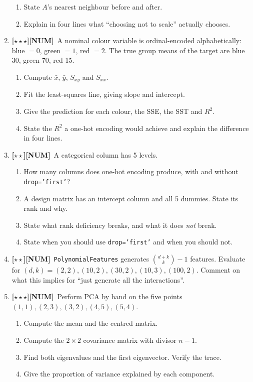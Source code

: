 \documentclass[11pt,a4paper]{article}
\newcommand{\LA}{{\footnotesize\textbf{[$\star\star\star$]}}}
\newcommand{\LB}{{\footnotesize\textbf{[$\star\star$]}}}
\newcommand{\NUM}{{\footnotesize\textbf{[NUM]}}}
\newcommand{\Q}[1]{\item[\textbf{#1}]}
\begin{document}
\begin{enumerate}[leftmargin=2.2cm]
\begin{enumerate}[label=(\alph*)]
    \item State $A$'s nearest neighbour before and after.
    \item Explain in four lines what ``choosing not to scale'' actually chooses.
  \end{enumerate}
\Q{U4.65}\LA\NUM\ A nominal colour variable is ordinal-encoded alphabetically:
  blue $=0$, green $=1$, red $=2$. The true group means of the target are
  blue 30, green 70, red 15.
  \begin{enumerate}[label=(\alph*)]
    \item Compute $\bar x$, $\bar y$, $S_{xy}$ and $S_{xx}$.
    \item Fit the least-squares line, giving slope and intercept.
    \item Give the prediction for each colour, the SSE, the SST and $R^2$.
    \item State the $R^2$ a one-hot encoding would achieve and explain the
      difference in four lines.
  \end{enumerate}
\Q{U4.66}\LB\NUM\ A categorical column has 5 levels.
  \begin{enumerate}[label=(\alph*)]
    \item How many columns does one-hot encoding produce, with and without
      \texttt{drop='first'}?
    \item A design matrix has an intercept column and all 5 dummies. State its
      rank and why.
    \item State what rank deficiency breaks, and what it does \emph{not} break.
    \item State when you should use \texttt{drop='first'} and when you should
      not.
  \end{enumerate}
\Q{U4.67}\LB\NUM\ \texttt{PolynomialFeatures} generates $\binom{d+k}{k} - 1$
  features. Evaluate for $(d,k) = (2,2), (10,2), (30,2), (10,3), (100,2)$.
  Comment on what this implies for ``just generate all the interactions''.
\Q{U4.68}\LA\NUM\ Perform PCA by hand on the five points
  $(1,1), (2,3), (3,2), (4,5), (5,4)$.
  \begin{enumerate}[label=(\alph*)]
    \item Compute the mean and the centred matrix.
    \item Compute the $2\times2$ covariance matrix with divisor $n-1$.
    \item Find both eigenvalues and the first eigenvector. Verify the trace.
    \item Give the proportion of variance explained by each component.

\end{enumerate}
\end{enumerate}
\end{document}
